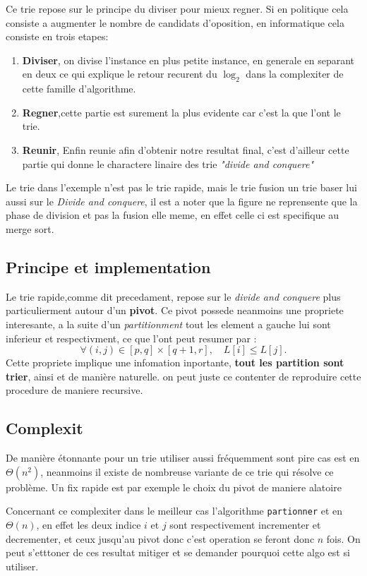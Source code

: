 \documentclass[French,Hoar.tex]{subfiles}
\begin{document}
  Ce trie repose sur le principe du diviser pour mieux regner. Si en politique cela consiste a augmenter le nombre
  de candidats d'oposition, en informatique cela consiste en trois etapes:
  \begin{enumerate}
    \item \textbf{\color{Nred}Diviser}, on divise l'instance en plus petite instance, en generale en separant en deux ce qui
      explique le retour recurent du $\log_2$ dans la complexiter de cette famille d'algorithme.
    \item \textbf{\color{Nred}Regner},cette partie est surement la plus evidente car c'est la que l'ont le trie.
    \item \textbf{\color{Nred}Reunir}, Enfin reunie afin d'obtenir notre resultat final, c'est d'ailleur cette
    partie qui donne le charactere linaire des trie \emph{"divide and conquere"}
  \end{enumerate}
    Le trie dans l'exemple n'est pas le trie rapide, mais le trie fusion un trie baser lui aussi sur le \emph{Divide and 
    conquere}, il est a noter que la figure ne reprensente que la phase de division et pas la fusion elle meme, en effet celle 
    ci est specifique au merge sort.

  \subsection{Principe et implementation}
  Le trie rapide,comme dit precedament, repose sur le \emph{divide and conquere} plus particulierment autour d'un \textbf{\color{nred}pivot}.
  Ce pivot possede neanmoins une propriete interesante, a la suite d'un \emph{partitionment} tout les element a gauche lui sont inferieur et respectivment, ce que l'ont peut resumer par :
  $$
    \forall (i,j)\in[p,q]\times[q+1,r],\quad L[i] \leq L[j].
  $$
  Cette propriete implique une infomation inportante, \textbf{tout les partition sont trier}, ainsi et de manière naturelle.
  on peut juste ce contenter de reproduire cette procedure de maniere recursive.
  
  \subsection{Complexit\e}
  De manière étonnante pour un trie utiliser aussi fréquemment sont pire cas est en $\Theta(n^2)$, neanmoins il existe
  de nombreuse variante de ce trie qui résolve ce problème. Un fix rapide est par exemple le choix du pivot de maniere al\e atoire

  Concernant ce complexiter dans le meilleur cas l'algorithme \texttt{partionner} et en $\Theta(n)$, en effet les deux indice
  $i$ et $j$ sont respectivement incrementer et decrementer, et ceux jusqu'au pivot donc c'est operation se feront donc $n$ fois.
  On peut s'etttoner de ces resultat mitiger et se demander pourquoi cette algo est si utiliser.
\end{document}
